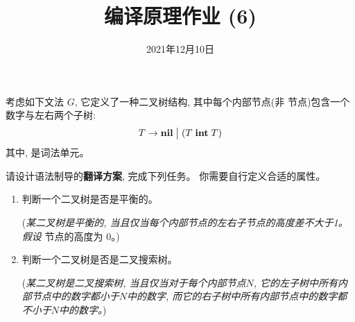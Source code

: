 \documentclass[a4paper, justified]{tufte-handout}
\title{编译原理作业 (6)}
\date{2021年12月10日}
\begin{document}
\maketitle
\noplagiarism %
\begin{abstract}
\end{abstract}
\beginrequired

\begin{problem}[\score{20 = 10 + 10}]
  考虑如下文法 $G$, 它定义了一种二叉树结构,
  其中每个内部节点(非  节点)包含一个数字与左右两个子树:
  \begin{align*}
    T &\to \text{\bf nil} \;\big\lvert\; (T \;\texttt{\bf int}\; T) \\
  \end{align*}
  其中, \intkw{} 是词法单元。

  \noindent 请设计语法制导的{\bf 翻译方案}, 完成下列任务。
  你需要自行定义合适的属性。
  \begin{enumerate}[(1)]
    \item 判断一个二叉树是否是平衡的。

    ({\it 某二叉树是平衡的, 当且仅当每个内部节点的左右子节点的高度差不大于1。
        假设 } 节点的高度为 0。)
    \item 判断一个二叉树是否是二叉搜索树。

    ({\it 某二叉树是二叉搜索树, 当且仅当对于每个内部节点$N$,
        它的左子树中所有内部节点中的数字都小于$N$中的数字,
        而它的右子树中所有内部节点中的数字都不小于$N$中的数字。})
  \end{enumerate}
\end{problem}
\end{document}
